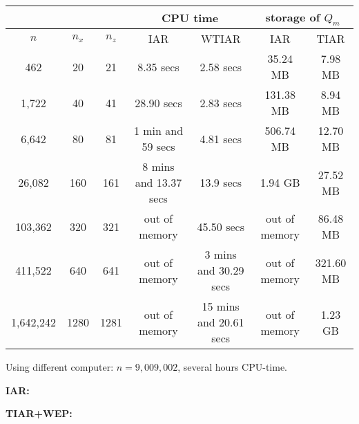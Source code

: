 \documentclass[10pt]{beamer}
\begin{document}
\begin{frame}[plain]
 \begin{center}
   \resizebox{12cm}{!} {
    \begin{tabular}{c|c|c|c|c|c|c|}
     \cline{4-7}
		\multicolumn{3}{c}{}		&	 \multicolumn{2}{|c|}{CPU time } 			&	\multicolumn{2}{|c|}{storage of $Q_m$} 		\\
\hline
\multicolumn{1}{|c|}{$n$}		&	$n_x$	&	$n_z$	&	  IAR				&				WTIAR&	 		IAR 		&	 TIAR				\\
\hline
\multicolumn{1}{|c|}{462}		&	20	&	21	& 	 8.35 secs			&		2.58 secs		&		35.24 MB	&	7.98 MB				\\
\hline
\multicolumn{1}{|c|}{1,722}		&	40	&	41	& 	 28.90 secs			&		2.83 secs		&		131.38 MB	&	8.94 MB				\\
\hline
\multicolumn{1}{|c|}{6,642}		&	80	&	81	& 	1 min and 59 secs		&		4.81 secs		&		506.74 MB	&	12.70 MB			\\
\hline
\multicolumn{1}{|c|}{26,082}		&	160	&	161	& 	8 mins and 13.37 secs		&		13.9 secs		&		1.94 GB		&	27.52 MB			\\
\hline
\multicolumn{1}{|c|}{103,362}		&	320	&	321	& 	out of memory			&		45.50 secs		&		out of memory	&	86.48 MB			\\
\hline
\multicolumn{1}{|c|}{411,522}		&	640	&	641	& 	out of memory			&		3 mins and 30.29 secs	&		out of memory	&	321.60 MB			\\
\hline
\multicolumn{1}{|c|}{1,642,242}		&	1280	&	1281	& 	out of memory			&		15 mins and 20.61 secs	&		out of memory	&	1.23 GB				\\
\hline
\end{tabular}
}
 \end{center}
{\small 
Using different computer: 
$n=9,009,002$, several hours CPU-time.}\pause
\begin{center}
\begin{minipage}{0.6\textwidth}
{\bf IAR:}\\
\end{minipage}%
\begin{minipage}{0.6\textwidth}
{\bf TIAR+WEP:}
\end{minipage}
\end{center}

\end{frame}
\end{document}
